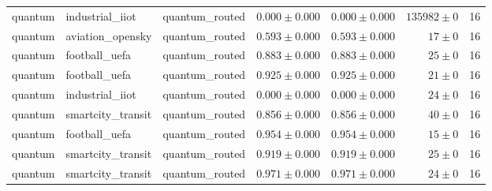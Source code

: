 \begin{table}[htbp]
\begin{tabular}{l l l r r r r}
quantum & industrial\_iiot & quantum\_routed & $0.000\pm0.000$ & $0.000\pm0.000$ & $135982\pm0$ & 16 \\
quantum & aviation\_opensky & quantum\_routed & $0.593\pm0.000$ & $0.593\pm0.000$ & $17\pm0$ & 16 \\
quantum & football\_uefa & quantum\_routed & $0.883\pm0.000$ & $0.883\pm0.000$ & $25\pm0$ & 16 \\
quantum & football\_uefa & quantum\_routed & $0.925\pm0.000$ & $0.925\pm0.000$ & $21\pm0$ & 16 \\
quantum & industrial\_iiot & quantum\_routed & $0.000\pm0.000$ & $0.000\pm0.000$ & $24\pm0$ & 16 \\
quantum & smartcity\_transit & quantum\_routed & $0.856\pm0.000$ & $0.856\pm0.000$ & $40\pm0$ & 16 \\
quantum & football\_uefa & quantum\_routed & $0.954\pm0.000$ & $0.954\pm0.000$ & $15\pm0$ & 16 \\
quantum & smartcity\_transit & quantum\_routed & $0.919\pm0.000$ & $0.919\pm0.000$ & $25\pm0$ & 16 \\
quantum & smartcity\_transit & quantum\_routed & $0.971\pm0.000$ & $0.971\pm0.000$ & $24\pm0$ & 16 \\
\hline
\end{tabular}
\end{table}
